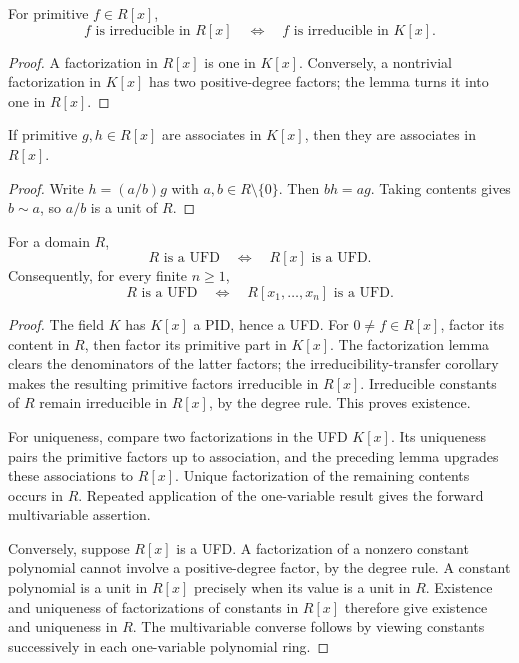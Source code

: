 \begin{corollary}
For primitive \(f\in R[x]\),
\[f\text{ is irreducible in }R[x]\quad\Longleftrightarrow\quad
f\text{ is irreducible in }K[x].\]
\end{corollary}
\begin{proof}
A factorization in \(R[x]\) is one in \(K[x]\).  Conversely, a nontrivial
factorization in \(K[x]\) has two positive-degree factors; the lemma turns it
into one in \(R[x]\).
\end{proof}

\begin{lemma}
If primitive \(g,h\in R[x]\) are associates in \(K[x]\), then they are
associates in \(R[x]\).
\end{lemma}
\begin{proof}
Write \(h=(a/b)g\) with \(a,b\in R\setminus\{0\}\).  Then \(bh=ag\).
Taking contents gives \(b\sim a\), so \(a/b\) is a unit of \(R\).
\end{proof}

\begin{theorem}
For a domain \(R\),
\[
R\text{ is a UFD}\quad\Longleftrightarrow\quad R[x]\text{ is a UFD}.
\]
Consequently, for every finite \(n\ge1\),
\[
R\text{ is a UFD}\quad\Longleftrightarrow\quad
R[x_1,\ldots,x_n]\text{ is a UFD}.
\]
\end{theorem}
\begin{proof}
The field \(K\) has \(K[x]\) a PID, hence a UFD.  For \(0\ne f\in R[x]\),
factor its content in \(R\), then factor its primitive part in \(K[x]\).
The factorization lemma clears the denominators of the latter factors; the
irreducibility-transfer corollary makes the resulting primitive factors
irreducible in \(R[x]\).  Irreducible constants of \(R\) remain irreducible
in \(R[x]\), by the degree rule.  This proves existence.

For uniqueness, compare two factorizations in the UFD \(K[x]\).  Its
uniqueness pairs the primitive factors up to association, and the preceding
lemma upgrades these associations to \(R[x]\).  Unique factorization of the
remaining contents occurs in \(R\).  Repeated application of the one-variable
result gives the forward multivariable assertion.

Conversely, suppose \(R[x]\) is a UFD.  A factorization of a nonzero constant
polynomial cannot involve a positive-degree factor, by the degree rule.  A
constant polynomial is a unit in \(R[x]\) precisely when its value is a unit
in \(R\).  Existence and uniqueness of factorizations of constants in \(R[x]\)
therefore give existence and uniqueness in \(R\).  The multivariable converse
follows by viewing constants successively in each one-variable polynomial ring.
\end{proof}

